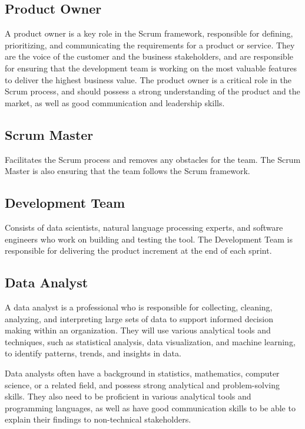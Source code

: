 \documentclass[a4paper,12pt]{article}
\begin{document}
\subsection{Product Owner}
A product owner is a key role in the Scrum framework, responsible for defining, prioritizing, and communicating the requirements for a product or service.
They are the voice of the customer and the business stakeholders, and are responsible for ensuring that the development team is working on the most valuable features to deliver the highest business value.
The product owner is a critical role in the Scrum process, and should possess a strong understanding of the product and the market, as well as good communication and leadership skills. 

\subsection{Scrum Master}
Facilitates the Scrum process and removes any obstacles for the team. The Scrum Master is also ensuring that the team follows the Scrum framework.

\subsection{Development Team}
Consists of data scientists, natural language processing experts, and software engineers who work on building and testing the tool.  The Development Team is responsible for delivering the product increment at the end of each sprint.

\subsection{Data Analyst}
A data analyst is a professional who is responsible for collecting, cleaning, analyzing, and interpreting large sets of data to support informed decision making within an organization.
They will use various analytical tools and techniques, such as statistical analysis, data visualization, and machine learning, to identify patterns, trends, and insights in data.

Data analysts often have a background in statistics, mathematics, computer science, or a related field, and possess strong analytical and problem-solving skills.
They also need to be proficient in various analytical tools and programming languages, as well as have good communication skills to be able to explain their findings to non-technical stakeholders.
\end{document}
